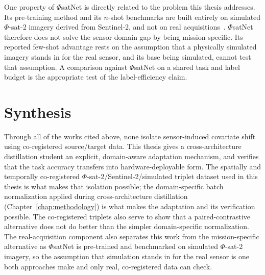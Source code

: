 One property of $\Phi$satNet is directly related to the problem this thesis addresses.
Its pre-training method and its $n$-shot benchmarks are built entirely on simulated $\Phi$-sat-2 imagery derived from Sentinel-2, and not on real acquisitions~\cite{phisatnet}.
$\Phi$satNet therefore does not solve the sensor domain gap by being mission-specific.
Its reported few-shot advantage rests on the assumption that a physically simulated imagery stands in for the real sensor, and its base being simulated, cannot test that assumption.
A comparison against $\Phi$satNet on a shared task and label budget is the appropriate test of the label-efficiency claim.

\section{Synthesis}

Through all of the works cited above, none isolate sensor-induced covariate shift using co-registered source/target data.
This thesis gives a cross-architecture distillation student an explicit, domain-aware adaptation mechanism, and verifies that the task accuracy transfers into hardware-deployable form.
The spatially and temporally co-registered $\Phi$-sat-2/Sentinel-2/simulated triplet dataset used in this thesis is what makes that isolation possible; the domain-specific batch normalization applied during cross-architecture distillation (Chapter~\ref{chap:methodology}) is what makes the adaptation and its verification possible.
The co-registered triplets also serve to show that a paired-contrastive alternative does not do better than the simpler domain-specific normalization.
The real-acquisition component also separates this work from the mission-specific alternative as $\Phi$satNet is pre-trained and benchmarked on simulated $\Phi$-sat-2 imagery, so the assumption that simulation stands in for the real sensor is one both approaches make and only real, co-registered data can check.

